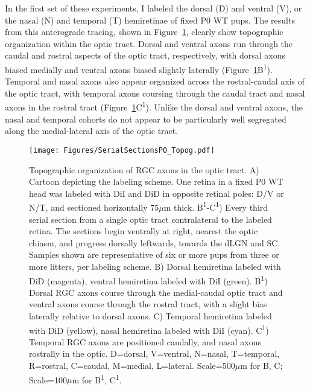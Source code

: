 In the first set of these experiments, I labeled the dorsal (D) and ventral (V), or the nasal (N) and temporal (T) hemiretinae of fixed P0 WT pups.
The results from this anterograde tracing, shown in Figure~\ref{Figures/SerialSectionsP0Topog}, clearly show topographic organization within the optic tract.
Dorsal and ventral axons run through the caudal and rostral aspects of the optic tract, respectively, with dorsal axons biased medially and ventral axons biased slightly laterally (Figure~\ref{Figures/SerialSectionsP0Topog}B\textsuperscript{1}).
Temporal and nasal axons also appear organized across the rostral-caudal axis of the optic tract, with temporal axons coursing through the caudal tract and nasal axons in the rostral tract (Figure~\ref{Figures/SerialSectionsP0Topog}C\textsuperscript{1}).
Unlike the dorsal and ventral axons, the nasal and temporal cohorts do not appear to be particularly well segregated along the medial-lateral axis of the optic tract.
\begin{figure}[hbtp]
    \begin{center}
        \texttt{[image: Figures/SerialSectionsP0\_Topog.pdf]}
        \caption[Topographic organization of RGC axons in the optic tract.]
        {Topographic organization of RGC axons in the optic tract.
        A) Cartoon depicting the labeling scheme.
        One retina in a fixed P0 WT head was labeled with DiI and DiD in opposite retinal poles: D/V or N/T, and sectioned horizontally 75$\mu$m thick.
        B\textsuperscript{1}-C\textsuperscript{1}) Every third serial section from a single optic tract contralateral to the labeled retina.
        The sections begin ventrally at right, nearest the optic chiasm, and progress dorsally leftwards, towards the dLGN and SC.
        Samples shown are representative of six or more pups from three or more litters, per labeling scheme. %
        B) Dorsal hemiretina labeled with DiD (magenta), ventral hemiretina labeled with DiI (green).
        B\textsuperscript{1}) Dorsal RGC axons course through the medial-caudal optic tract and ventral axons course through the rostral tract, with a slight bias laterally relative to dorsal axons.
        C) Temporal hemiretina labeled with DiD (yellow), nasal hemiretina labeled with DiI (cyan).
        C\textsuperscript{1}) Temporal RGC axons are positioned caudally, and nasal axons rostrally in the optic.
        D=dorsal, V=ventral, N=nasal, T=temporal, R=rostral, C=caudal, M=medial, L=lateral.
        Scale=500$\mu$m for B, C; Scale=100$\mu$m for B\textsuperscript{1}, C\textsuperscript{1}.}
        \label{Figures/SerialSectionsP0Topog}
    \end{center}
\end{figure}

